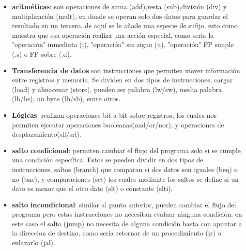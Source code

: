 \documentclass[12pt]{article}
\begin{document}
     \begin{itemize}
        \item \textbf{aritméticas}: son operaciones de suma (add),resta (sub),división (div) y multiplicación (mult), en donde se operan
         solo dos datos para guardar el resultado en un tercero. de aquí se le añade una especie de sufijo, esto como muestra que esa operación 
         realiza una acción especial, como seria la "operación" inmediata (i), "operación" sin signo (u), "operación"
         FP simple (.s) o FP sobre (.d).
        \item \textbf{Transferencia de datos} son instrucciones que permiten mover información
        entre registros y memoria. Se dividen en dos tipos de instrucciones, cargar (load) y almacenar (store), pueden ser palabra (lw/sw),
        media palabra (lh/hs), un byte (lb/sb), entre otros.
        \item \textbf{Lógicas}: realizan operaciones bit a bit sobre registros, los cuales nos
        permiten ejecutar operaciones booleanas(and/or/nor), y operaciones de desplazamiento(sll/srl).
        \item \textbf{salto condicional}: permiten cambiar el flujo del programa solo si se cumple una condición específica. Estos se pueden dividir
         en dos tipos de instrucciones, saltos (branch) que comparan si dos datos son iguales (beq) o no (bne), y comparaciones (set)
         los cuales mediante los saltos se define si un dato es menor que el otro dato (slt) o constante (slti).
        \item \textbf{salto incondicional}: similar al punto anterior, pueden cambiar el flujo del
        programa pero estas instrucciones no necesitan evaluar ninguna condición. en este caso el salto (jump) no necesita de alguna condición
        basta con apuntar a la direccion de destino, como seria retornar de un procedimiento (jr) o enlazarlo (jal).
     \end{itemize}
\end{document}
